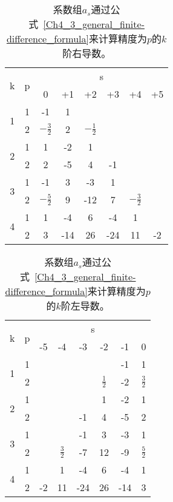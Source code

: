 \documentclass[twoside]{book}
\begin{document}
\begin{CJK*}{GBK}{song}
\begin{table}[t!]
	\begin{center}
		\begin{tabular}{c|c||c|c|c|c|c|c}
			\multirow{2}{1em}{k} & \multirow{2}{1em}{p} & \multicolumn{6}{c}{s} \\
			\cline{3-8}
			&  & 0 & +1 & +2 & +3 & +4 & +5 \\
			\hline\hline
			\multirow{2}{1em}{1} & 1 & -1 & 1 &  &  &  &  \\
			\cline{2-8}
			& 2 & $-\frac{3}{2}$ & 2 & $-\frac{1}{2}$ &  &  &  \\
			\hline
			\multirow{2}{1em}{2} & 1 & 1 & -2 & 1 &  &  &  \\
			\cline{2-8}
			& 2 & 2 & -5 & 4 & -1 &  &  \\
			\hline
			\multirow{2}{1em}{3} & 1 & -1 & 3 & -3 & 1 &  &  \\
			\cline{2-8}
			& 2 & $-\frac{5}{2}$ & 9 & -12 & 7 & $-\frac{3}{2}$ &  \\
			\hline
			\multirow{2}{1em}{4} & 1 & 1 & -4 & 6 & -4 & 1 &  \\
			\cline{2-8}
			& 2 & 3 & -14 & 26 & -24 & 11 & -2 \\
		\end{tabular}
	\end{center}
	\caption{系数组$a_s$通过公式~\eqref{Ch4_3_general_finite-difference_formula}来计算精度为$p$的$k$阶右导数。}
	\label{Table_4_6}
\end{table}


\begin{table}[t!]
	\begin{center}
		\begin{tabular}{c|c||c|c|c|c|c|c}
			\multirow{2}{1em}{k} & \multirow{2}{1em}{p} & \multicolumn{6}{c}{s} \\
			\cline{3-8}
			&  & -5 & -4 & -3 & -2 & -1 & 0 \\
			\hline\hline
			\multirow{2}{1em}{1} & 1 &  &  &  &  & -1 & 1 \\
			\cline{2-8}
			& 2 &  &  &  & $\frac{1}{2}$ & -2 & $\frac{3}{2}$ \\
			\hline
			\multirow{2}{1em}{2} & 1 &  &  &  & 1 & -2 & 1 \\
			\cline{2-8}
			& 2 &  &  & -1 & 4 & -5 & 2 \\
			\hline
			\multirow{2}{1em}{3} & 1 &  &  & -1 & 3 & -3 & 1 \\
			\cline{2-8}
			& 2 &  & $\frac{3}{2}$ & -7 & 12 & -9 & $\frac{5}{2}$ \\
			\hline
			\multirow{2}{1em}{4} & 1 &  & 1 & -4 & 6 & -4 & 1 \\
			\cline{2-8}
			& 2 & -2 & 11 & -24 & 26 & -14 & 3 \\
		\end{tabular}
	\end{center}
	\caption{系数组$a_s$通过公式~\eqref{Ch4_3_general_finite-difference_formula}来计算精度为$p$的$k$阶左导数。}
	\label{Table_4_7}
\end{table}
	



\end{CJK*}
\end{document}

